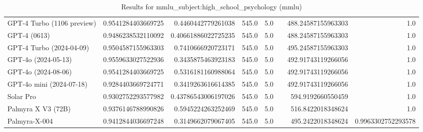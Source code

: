 \begin{table}[htp]
{\begin{tabular}{lrrrrrrr}
GPT-4 Turbo (1106 preview) & 0.9541284403669725 & 0.4460442779261038 & 545.0 & 5.0 &  & 488.24587155963303 & 1.0 \\
GPT-4 (0613) & 0.9486238532110092 & 0.40661886022725235 & 545.0 & 5.0 &  & 488.24587155963303 & 1.0 \\
GPT-4 Turbo (2024-04-09) & 0.9504587155963303 & 0.7410666920723171 & 545.0 & 5.0 &  & 495.24587155963303 & 1.0 \\
GPT-4o (2024-05-13) & 0.9559633027522936 & 0.3435875463923183 & 545.0 & 5.0 &  & 492.91743119266056 & 1.0 \\
GPT-4o (2024-08-06) & 0.9541284403669725 & 0.5316181160988064 & 545.0 & 5.0 &  & 492.91743119266056 & 1.0 \\
GPT-4o mini (2024-07-18) & 0.9284403669724771 & 0.3419263616614385 & 545.0 & 5.0 &  & 492.91743119266056 & 1.0 \\
Solar Pro & 0.9302752293577982 & 0.43786543006197026 & 545.0 & 5.0 &  & 594.9192660550459 & 1.0 \\
Palmyra X V3 (72B) & 0.9376146788990826 & 0.5945224263252469 & 545.0 & 5.0 &  & 516.8422018348624 & 1.0 \\
Palmyra-X-004 & 0.9412844036697248 & 0.3149662079067405 & 545.0 & 5.0 &  & 495.2422018348624 & 0.9963302752293578 \\
\bottomrule
\end{tabular}}
\caption{Results for mmlu_subject:high_school_psychology (mmlu)}
\label{fig:mmlu_subject:high_school_psychology (mmlu)}
\end{table}